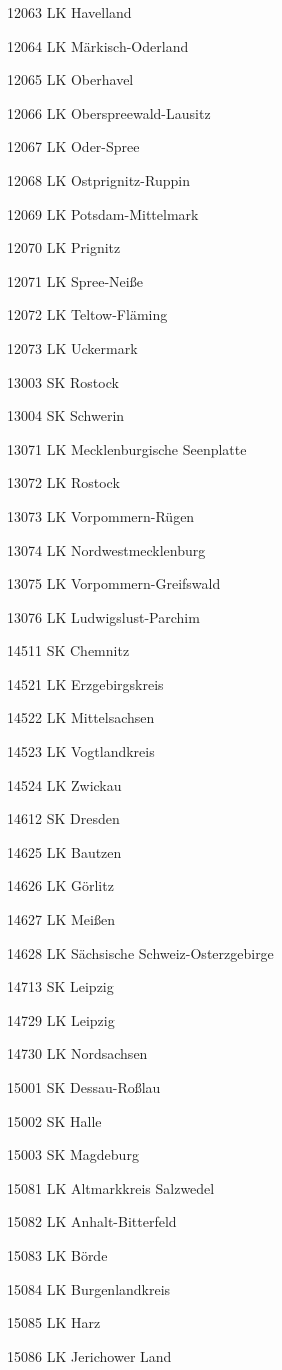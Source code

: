 12063  LK Havelland

12064  LK Märkisch-Oderland

12065  LK Oberhavel

12066  LK Oberspreewald-Lausitz

12067  LK Oder-Spree

12068  LK Ostprignitz-Ruppin

12069  LK Potsdam-Mittelmark

12070  LK Prignitz

12071  LK Spree-Neiße

12072  LK Teltow-Fläming

12073  LK Uckermark

13003  SK Rostock

13004  SK Schwerin

13071  LK Mecklenburgische Seenplatte

13072  LK Rostock

13073  LK Vorpommern-Rügen

13074  LK Nordwestmecklenburg

13075  LK Vorpommern-Greifswald

13076  LK Ludwigslust-Parchim

14511  SK Chemnitz

14521  LK Erzgebirgskreis

14522  LK Mittelsachsen

14523  LK Vogtlandkreis

14524  LK Zwickau

14612  SK Dresden

14625  LK Bautzen

14626  LK Görlitz

14627  LK Meißen

14628  LK Sächsische Schweiz-Osterzgebirge

14713  SK Leipzig

14729  LK Leipzig

14730  LK Nordsachsen

15001  SK Dessau-Roßlau

15002  SK Halle

15003  SK Magdeburg

15081  LK Altmarkkreis Salzwedel

15082  LK Anhalt-Bitterfeld

15083  LK Börde

15084  LK Burgenlandkreis

15085  LK Harz

15086  LK Jerichower Land

